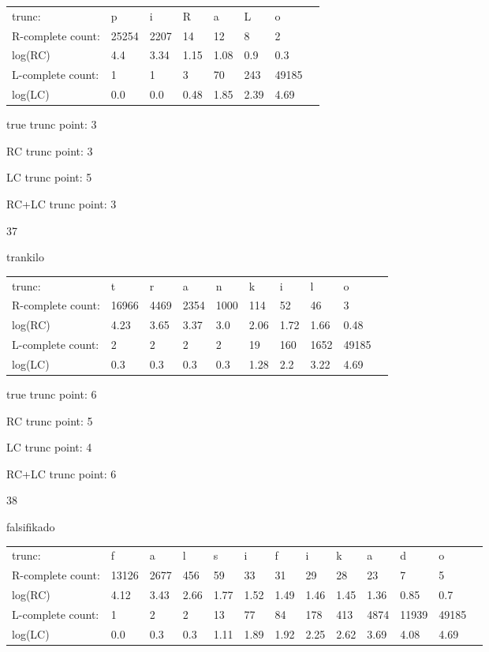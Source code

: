 \documentclass{article}
\begin{document}
\begin{tabular}{l|lllllll}
trunc: & p & i & R & a & L & o & \\ 
R-complete count: & 25254 & 2207 & 14 & 12 & 8 & 2 & \\ 
log(RC) & 4.4 & 3.34 & 1.15 & 1.08 & 0.9 & 0.3 & \\ 
L-complete count: & 1 & 1 & 3 & 70 & 243 & 49185 & \\ 
log(LC) & 0.0 & 0.0 & 0.48 & 1.85 & 2.39 & 4.69 & \\ 
\end{tabular}

true trunc point: 3

RC trunc point: 3

LC trunc point: 5

RC+LC trunc point: 3

\newpage

37

trankilo

\begin{tabular}{l|lllllllll}
trunc: & t & r & a & n & k & i & l & o & \\ 
R-complete count: & 16966 & 4469 & 2354 & 1000 & 114 & 52 & 46 & 3 & \\ 
log(RC) & 4.23 & 3.65 & 3.37 & 3.0 & 2.06 & 1.72 & 1.66 & 0.48 & \\ 
L-complete count: & 2 & 2 & 2 & 2 & 19 & 160 & 1652 & 49185 & \\ 
log(LC) & 0.3 & 0.3 & 0.3 & 0.3 & 1.28 & 2.2 & 3.22 & 4.69 & \\ 
\end{tabular}

true trunc point: 6

RC trunc point: 5

LC trunc point: 4

RC+LC trunc point: 6

\vspace{1em}

38

falsifikado

\begin{tabular}{l|llllllllllll}
trunc: & f & a & l & s & i & f & i & k & a & d & o & \\ 
R-complete count: & 13126 & 2677 & 456 & 59 & 33 & 31 & 29 & 28 & 23 & 7 & 5 & \\ 
log(RC) & 4.12 & 3.43 & 2.66 & 1.77 & 1.52 & 1.49 & 1.46 & 1.45 & 1.36 & 0.85 & 0.7 & \\ 
L-complete count: & 1 & 2 & 2 & 13 & 77 & 84 & 178 & 413 & 4874 & 11939 & 49185 & \\ 
log(LC) & 0.0 & 0.3 & 0.3 & 1.11 & 1.89 & 1.92 & 2.25 & 2.62 & 3.69 & 4.08 & 4.69 & \\ 
\end{tabular}
\end{document}
